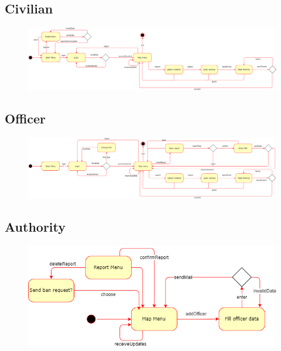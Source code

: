 \documentclass[12pt,a4paper]{article}
\begin{document}
	\subsection{Civilian}
			\begin{figure}[H]
				\centering
					\begin{adjustwidth}{-25mm}{-25mm}
					        \includegraphics[width=.9\paperwidth,keepaspectratio]{Images/civilian_states}
					\end{adjustwidth}
				\label{fig:automated_request_sequence}
			\end{figure}
	\subsection{Officer}
			\begin{figure}[H]
				\centering
				\begin{adjustwidth}{-25mm}{-25mm}
					        \includegraphics[width=.9\paperwidth,keepaspectratio]{Images/officer_states}
					\end{adjustwidth}
				\label{fig:automated_request_sequence}
			\end{figure}
	\subsection{Authority}
			\begin{figure}[H]
				\centering
				\includegraphics[width=.9\textwidth,keepaspectratio]{Images/authority_states}
				\label{fig:automated_request_sequence}
			\end{figure}
\end{document}
